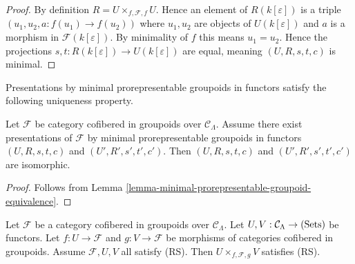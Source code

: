 \begin{proof}
By definition $R = U \times_{f,\mathcal F, f} U$.  Hence an element of 
$R(k[\varepsilon])$ is a triple $(u_1, u_2, a: f(u_1) \rightarrow f(u_2))$ 
where $u_1,u_2$ are objects of $U(k[\varepsilon])$ and $a$ is a morphism in 
$\mathcal F(k[\varepsilon])$.  By minimality of $f$ this means $u_1 = u_2$.  
Hence the projections $s,t: R(k[\varepsilon]) \rightarrow U(k[\varepsilon])$ 
are equal, meaning  $(U,R,s,t,c)$ is minimal.
\end{proof}

\noindent
Presentations by minimal prorepresentable groupoids in functors satisfy the 
following uniqueness property.
\begin{lemma}
Let $\mathcal F$ be category cofibered in groupoids over $\mathcal 
C_{\Lambda}$. Assume there exist presentations of $\mathcal F$ by minimal 
prorepresentable groupoids in functors $(U,R,s,t,c)$ and $(U',R',s',t',c')$. 
Then $(U,R,s,t,c)$ and $(U',R',s',t',c')$ are isomorphic.
\end{lemma}

\begin{proof}
Follows from Lemma \ref{lemma-minimal-prorepresentable-groupoid-equivalence}.
\end{proof}

\begin{lemma}
\label{lemma-RS-fiber-product-morphisms}
Let $\mathcal F$ be a category cofibered in groupoids over $\mathcal 
C_{\Lambda}$.  Let $U,V: \mathcal C_{\Lambda} \rightarrow \textnormal{(Sets)}$ 
be functors.  Let $f: U \rightarrow \mathcal F$ and $g: V \rightarrow \mathcal 
F$ be morphisms of categories cofibered in groupoids.  Assume $\mathcal F, U, 
V$ all satisfy (RS).  Then $U \times_{f, \mathcal F, g} V$ satisfies (RS).
\end{lemma}

